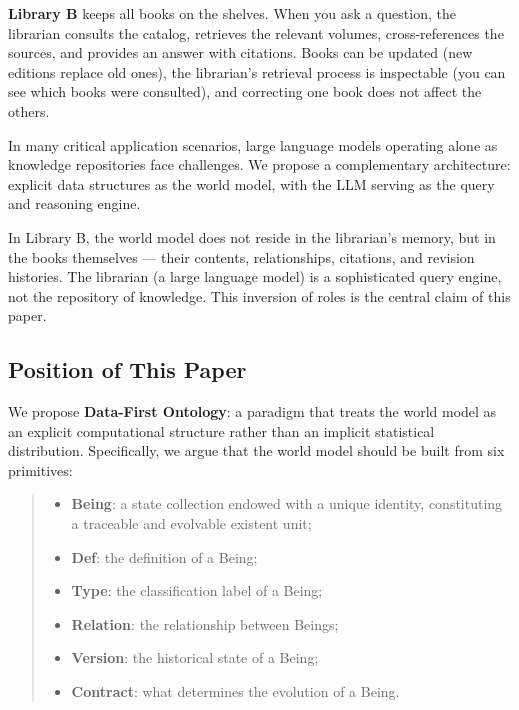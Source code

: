 \documentclass[11pt,a4paper]{article}
\begin{document}
\textbf{Library B} keeps all books on the shelves. When you ask a
question, the librarian consults the catalog, retrieves the relevant
volumes, cross-references the sources, and provides an answer with
citations. Books can be updated (new editions replace old ones), the
librarian's retrieval process is inspectable (you can see which books
were consulted), and correcting one book does not affect the others.

In many critical application scenarios, large language models operating
alone as knowledge repositories face challenges. We propose a
complementary architecture: explicit data structures as the world model,
with the LLM serving as the query and reasoning engine.

In Library B, the world model does not reside in the librarian's memory,
but in the books themselves --- their contents, relationships,
citations, and revision histories. The librarian (a large language
model) is a sophisticated query engine, not the repository of knowledge.
This inversion of roles is the central claim of this paper.

\subsection{Position of This Paper}\label{position-of-this-paper}

We propose \textbf{Data-First Ontology}: a paradigm that treats the
world model as an explicit computational structure rather than an
implicit statistical distribution. Specifically, we argue that the world
model should be built from six primitives:

\begin{quote}
\begin{itemize}
\tightlist
\item
  \textbf{Being}: a state collection endowed with a unique identity,
  constituting a traceable and evolvable existent unit;
\item
  \textbf{Def}: the definition of a Being;
\item
  \textbf{Type}: the classification label of a Being;
\item
  \textbf{Relation}: the relationship between Beings;
\item
  \textbf{Version}: the historical state of a Being;
\item
  \textbf{Contract}: what determines the evolution of a Being.
\end{itemize}
\end{quote}
\end{document}
